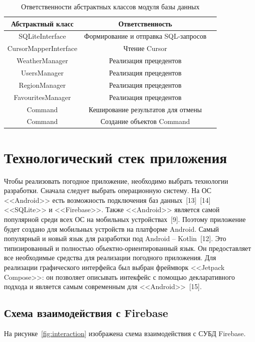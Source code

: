 \begin{table}[h!]
    \centering
    \begin{tabular} { |c|c|c| }
        \hline
            \textbf{Абстрактный класс} & \textbf{Ответственность} \\
        \hline
            SQLiteInterface & Формирование и отправка SQL-запросов \\
        \hline
            CursorMapperInterface & Чтение Cursor \\
        \hline
            WeatherManager & Реализация прецедентов \\
        \hline
            UsersManager & Реализация прецедентов \\
        \hline
            RegionManager & Реализация прецедентов \\
        \hline
            FavouritesManager & Реализация прецедентов \\
        \hline
            Command & Кеширование результатов для отмены \\
        \hline
            Command & Создание объектов Command \\
        \hline
        \end{tabular}
    \caption{\centering Ответственности абстрактных классов модуля базы данных}
    \label{table:responsibility}
\end{table}

\section{Технологический стек приложения}
Чтобы реализовать погодное приложение, необходимо выбрать технологии разработки.
Сначала следует выбрать операционную систему.
На ОС <<Android>> есть возможность подключения баз данных~[13]~[14] <<SQLite>> и <<Firebase>>.
Также <<Android>> является самой популярной среди всех ОС на мобильных устройствах~[9].
Поэтому приложение будет создано для мобильных устройств на платформе Android.
Самый популярный и новый язык для разработки под Android -- Kotlin~[12].
Это типизированный и полностью объектно-ориентированный язык.
Он предоставляет все необходимые средства для реализации погодного приложения.
Для реализации графического интерфейса был выбран фреймворк <<Jetpack Compose>>: он позволяет описывать интекфейс с помощью декларативного подхода и является самым современным для <<Android>>~[15].

\subsection*{Схема взаимодействия с Firebase}
На рисунке~\ref{fig:interaction} изображена схема взаимодействия с СУБД Firebase.

